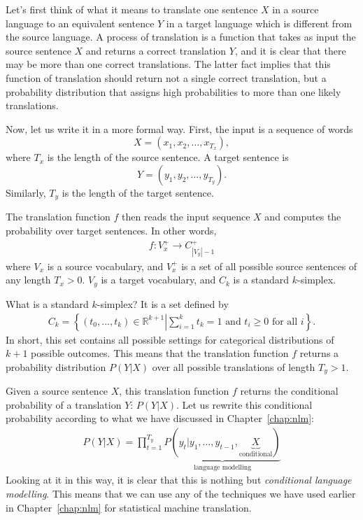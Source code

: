\documentclass{report}
\newcommand{\RR}[0]{\mathbb{R}}
\begin{document}
Let's first think of what it means to translate one sentence $X$ in a source
language to an equivalent sentence $Y$ in a target language which is different
from the source language. A process of translation is a function that takes as
input the source sentence $X$ and returns a correct translation $Y$, and it is
clear that there may be more than one correct translations. The latter fact
implies that this function of translation should return not a single correct
translation, but a probability distribution that assigns high probabilities to
more than one likely translations.

Now, let us write it in a more formal way. First, the input is a sequence of
words
\[
    X = (x_1, x_2, \ldots, x_{T_x}),
\]
where $T_x$ is the length of the source sentence. A target sentence is 
\[
Y = (y_1, y_2, \ldots, y_{T_y}).
\]
Similarly, $T_y$ is the length of the target sentence.

The translation function $f$ then reads the input sequence $X$ and computes the
probability over target sentences. In other words,
\begin{align}
    \label{eq:translation_f}
    f: V_x^+ \to C_{|V_y|-1}^+
\end{align}
where $V_x$ is a source vocabulary, and $V_x^+$ is a set of all possible source
sentences of any length $T_x>0$. $V_y$ is a target vocabulary, and $C_k$ is a
standard $k$-simplex. 

What is a standard $k$-simplex? It is a set defined by
\begin{align*}
    C_k = \left\{ 
        (t_0, \ldots, t_k) \in \RR^{k+1} 
        \left|
        \sum_{i=1}^k t_k = 1 
        \text{ and }
        t_i \geq 0 \text{ for all } i
        \right.
    \right\}.
\end{align*}
In short, this set contains all possible settings for categorical distributions
of $k+1$ possible outcomes. This means that the translation function $f$ returns
a probability distribution $P(Y|X)$ over all possible translations of length
$T_y>1$. 

Given a source sentence $X$, this translation function $f$ returns the
conditional probability of a translation $Y$: $P(Y | X)$. Let us rewrite this
conditional probability according to what we have discussed in
Chapter~\ref{chap:nlm}:
\begin{align}
    \label{eq:condlm}
    P(Y | X) = \prod_{t=1}^{T_y} 
    \underbrace{P(y_t | y_{1}, \ldots, y_{t-1},
        \underbrace{X}_{\text{conditional}}
)}_{\text{language modelling}}
\end{align}
Looking at it in this way, it is clear that this is nothing but {\em conditional
language modelling}.  This means that we can use any of the techniques we have
used earlier in Chapter~\ref{chap:nlm} for statistical machine translation.
\end{document}
